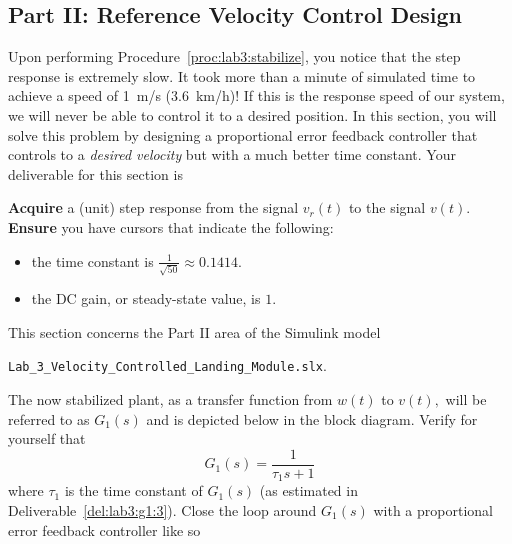 \subsection{Part II: Reference Velocity Control Design}\label{Lab:3:Part:II}
Upon performing Procedure~\ref{proc:lab3:stabilize}, you notice that the step response is extremely slow.
It took more than a minute of simulated time to achieve a speed of \SI{1}{m/s} (\SI{3.6}{km/h})!
If this is the response speed of our system, we will never be able to control it to a desired position.
In this section, you will solve this problem by designing a proportional error feedback controller that controls to a \emph{desired velocity} but with a much better time constant.
Your deliverable for this section is
%
\begin{deliverable}[label={del:lab3:g2:1}]
  \textbf{Acquire} a (unit) step response from the signal \(v_r(t)\) to the signal \(v(t).\)
  \textbf{Ensure} you have cursors that indicate the following:
  \begin{itemize}
    \item{the time constant is \(\frac{1}{\sqrt{50}} \approx 0.1414.\)}
    \item{the DC gain, or steady-state value, is \(1.\)}
  \end{itemize}
\end{deliverable}
%
This section concerns the Part II area of the Simulink model
\begin{center}
  \texttt{Lab\_3\_Velocity\_Controlled\_Landing\_Module.slx}.
\end{center}
The now stabilized plant, as a transfer function from \(w(t)\) to \(v(t),\) will be referred to as \(G_1(s)\) and is depicted below in the block diagram.
Verify for yourself that
\[
  G_1(s) = \frac{1}{\tau_1 s + 1}
\]
where \(\tau_1\) is the time constant of \(G_1(s)\) (as estimated in Deliverable~\ref{del:lab3:g1:3}).
Close the loop around \(G_1(s)\) with a proportional error feedback controller like so
%
